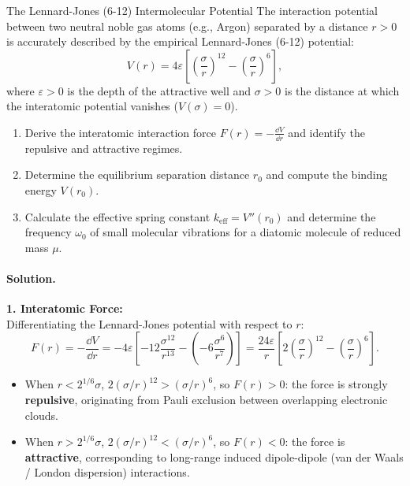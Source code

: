 \begin{workedexample}{The Lennard-Jones (6-12) Intermolecular Potential}
The interaction potential between two neutral noble gas atoms (e.g., Argon) separated by a distance $r > 0$ is accurately described by the empirical Lennard-Jones (6-12) potential:
\begin{equation}
V(r) = 4\varepsilon \left[ \left(\frac{\sigma}{r}\right)^{12} - \left(\frac{\sigma}{r}\right)^6 \right],
\end{equation}
where $\varepsilon > 0$ is the depth of the attractive well and $\sigma > 0$ is the distance at which the interatomic potential vanishes ($V(\sigma) = 0$).
\begin{enumerate}[leftmargin=1.4em,itemsep=3pt]
  \item Derive the interatomic interaction force $F(r) = -\frac{\dd V}{\dd r}$ and identify the repulsive and attractive regimes.
  \item Determine the equilibrium separation distance $r_0$ and compute the binding energy $V(r_0)$.
  \item Calculate the effective spring constant $k_{\text{eff}} = V''(r_0)$ and determine the frequency $\omega_0$ of small molecular vibrations for a diatomic molecule of reduced mass $\mu$.
\end{enumerate}

\paragraph{Solution.}
\textbf{1. Interatomic Force:}\\
Differentiating the Lennard-Jones potential with respect to $r$:
\[
F(r) = -\frac{\dd V}{\dd r} = -4\varepsilon \left[ -12\frac{\sigma^{12}}{r^{13}} - \left(-6\frac{\sigma^6}{r^7}\right) \right] = \frac{24\varepsilon}{r}\left[ 2\left(\frac{\sigma}{r}\right)^{12} - \left(\frac{\sigma}{r}\right)^6 \right].
\]
\begin{itemize}[leftmargin=1.5em,itemsep=2pt]
  \item When $r < 2^{1/6}\sigma$, $2(\sigma/r)^{12} > (\sigma/r)^6$, so $F(r) > 0$: the force is strongly \textbf{repulsive}, originating from Pauli exclusion between overlapping electronic clouds.
  \item When $r > 2^{1/6}\sigma$, $2(\sigma/r)^{12} < (\sigma/r)^6$, so $F(r) < 0$: the force is \textbf{attractive}, corresponding to long-range induced dipole-dipole (van der Waals / London dispersion) interactions.
\end{itemize}


\end{workedexample}
